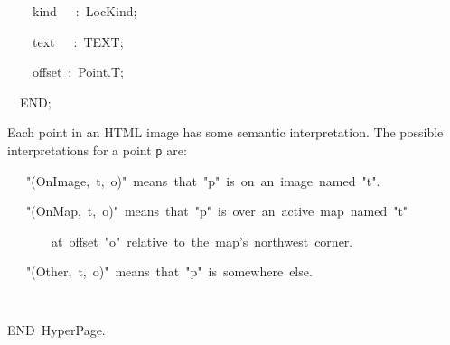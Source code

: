 {{\tab ~~~~kind~~~:~LocKind;\par
\tab ~~~~text~~~:~TEXT;\par
\tab ~~~~offset~:~Point.T;\par
\tab ~~END;}\par\medskip\noindent
{\rm  Each point in an HTML image has some semantic interpretation.  The
   possible interpretations for a point {\tt p} are:
\par
\par{}\noindent\par
{\display ~~~"(OnImage,~t,~o)"~means~that~"p"~is~on~an~image~named~"t".}\noindent\par
{\display ~~~"(OnMap,~t,~o)"~means~that~"p"~is~over~an~active~map~named~"t"}\noindent\par
{\display ~~~~~~~at~offset~"o"~relative~to~the~map's~northwest~corner.}\noindent\par
{\display ~~~"(Other,~t,~o)"~means~that~"p"~is~somewhere~else.}\noindent\par
\par}\par{\tt\parskip=0pt\parindent=0pt\progmode
\par\medskip \par\medskip
\tab END~HyperPage.}\par\medskip\noindent

}
